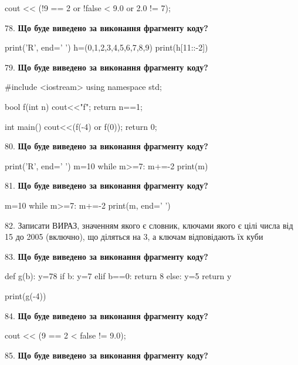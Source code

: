 \documentclass[11pt]{article}
\begin{document}
cout << (!9 == 2 or !false < 9.0 or 2.0 != 7);
\par\vspace{5mm}
78. \textbf{Що буде виведено за виконання фрагменту коду?}

print('R', end=' ')
h=(0,1,2,3,4,5,6,7,8,9)
print(h[11::-2])

\par\vspace{5mm}
79. \textbf{Що буде виведено за виконання фрагменту коду?}

#include <iostream>
using namespace std;

bool f(int n){
    cout<<"f";
    return n==1;
}

int main(){
    cout<<(f(-4) or f(0));
    return 0;
}
\par\vspace{5mm}
80. \textbf{Що буде виведено за виконання фрагменту коду?}

print('R', end=' ')
m=10
while m>=7:
    m+=-2
print(m)

\par\vspace{5mm}
81. \textbf{Що буде виведено за виконання фрагменту коду?}

m=10
while m>=7:
    m+=-2
print(m, end=' ')

\par\vspace{5mm}
82. 
Записати ВИРАЗ, значенням якого є словник, ключами якого є цілі числа від 15 до 2005 (включно), що діляться на 3, а ключам відповідають їх куби \par\vspace{5mm}
83. \textbf{Що буде виведено за виконання фрагменту коду?}

def g(b):
    y=78
    if b: 
        y=7
    elif b==0:
         return 8
    else:
         y=5
    return y

print(g(-4))
\par\vspace{5mm}
84. \textbf{Що буде виведено за виконання фрагменту коду?}

cout << (9 == 2 < false != 9.0);
\par\vspace{5mm}
85. \textbf{Що буде виведено за виконання фрагменту коду?}
\end{document}
